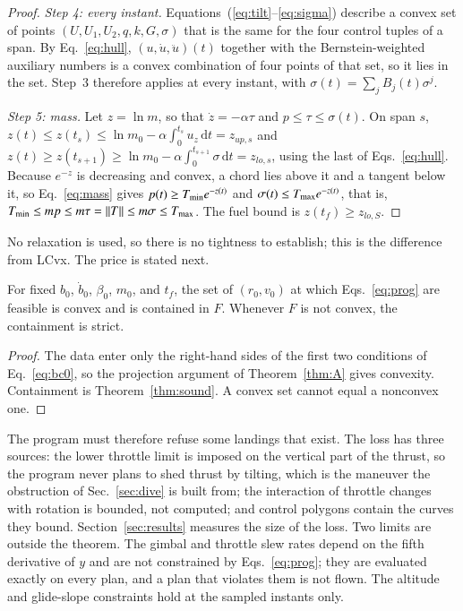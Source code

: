 \begin{proof}
\emph{Step 4: every instant.} Equations~(\ref{eq:tilt}--\ref{eq:sigma}) describe a convex set of points $(U,U_1,U_2,q,k,G,\sigma)$
that is the same for the four control tuples of a span. By Eq.~\eqref{eq:hull}, $(u,\dot u,\ddot u)(t)$ together with the
Bernstein-weighted auxiliary numbers is a convex combination of four points of that set, so it lies in the set. Step~3
therefore applies at every instant, with $\sigma(t)=\sum_jB_j(t)\sigma^j$.

\emph{Step 5: mass.} Let $z=\ln m$, so that $\dot z=-\alpha\tau$ and $p\le\tau\le\sigma(t)$. On span $s$,
$z(t)\le z(t_s)\le\ln m_0-\alpha\int_0^{t_s}u_z\,\mathrm dt=z_{up,s}$ and $z(t)\ge z(t_{s+1})\ge\ln m_0-\alpha\int_0^{t_{s+1}}\sigma\,\mathrm dt=z_{lo,s}$,
using the last of Eqs.~\eqref{eq:hull}. Because $e^{-z}$ is decreasing and convex, a chord lies above it and a tangent below it,
so Eq.~\eqref{eq:mass} gives $p(t)\ge T_{\min} e^{-z(t)}$ and $\sigma(t)\le T_{\max} e^{-z(t)}$, that is,
$T_{\min}\le mp\le m\tau=\lVert T\rVert\le m\sigma\le T_{\max}$. The fuel bound is $z(t_f)\ge z_{lo,S}$.
\end{proof}

No relaxation is used, so there is no tightness to establish; this is the difference from LCvx. The price is stated next.

\begin{proposition}\label{prop:inc}
For fixed $b_0$, $\dot b_0$, $\beta_0$, $m_0$, and $t_f$, the set of $(r_0,v_0)$ at which Eqs.~\eqref{eq:prog} are feasible is
convex and is contained in $F$. Whenever $F$ is not convex, the containment is strict.
\end{proposition}
\begin{proof}
The data enter only the right-hand sides of the first two conditions of Eq.~\eqref{eq:bc0}, so the projection argument of
Theorem~\ref{thm:A} gives convexity. Containment is Theorem~\ref{thm:sound}. A convex set cannot equal a nonconvex one.
\end{proof}

The program must therefore refuse some landings that exist. The loss has three sources: the lower throttle limit is imposed on
the vertical part of the thrust, so the program never plans to shed thrust by tilting, which is the maneuver the obstruction of
Sec.~\ref{sec:dive} is built from; the interaction of throttle changes with rotation is bounded, not computed; and control
polygons contain the curves they bound. Section~\ref{sec:results} measures the size of the loss. Two limits are outside the
theorem. The gimbal and throttle slew rates depend on the fifth derivative of $y$ and are not constrained by
Eqs.~\eqref{eq:prog}; they are evaluated exactly on every plan, and a plan that violates them is not flown. The altitude and
glide-slope constraints hold at the sampled instants only.


